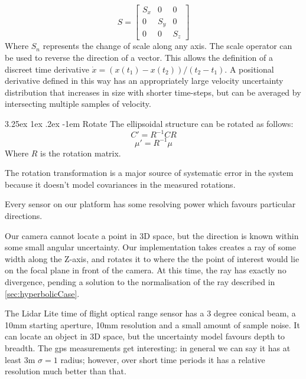 \documentclass[a4paper, 11pt, titlepage]{article}
\makeatletter
\newcounter{subsubsubsection}[subsubsection]
\renewcommand\paragraph{\@startsection{paragraph}{5}{\z@}%
  {3.25ex \@plus1ex \@minus.2ex}%
  {-1em}%
  {\normalfont\normalsize\bfseries}}
\makeatother
\begin{document}
        \begin{equation}
        S=\begin{bmatrix}
          S_x & 0 & 0 \\[0.3em]
          0 & S_y & 0 \\[0.3em]
          0 & 0 & S_z
        \end{bmatrix}
        \end{equation}
        Where \(S_n\) represents the change of scale along any axis.
        The scale operator can be used to reverse the direction of a vector.  This allows the definition of a discreet time derivative \(\dot{x} = (x(t_1) - x(t_2))/(t_2-t_1)\).  A positional derivative defined in this way has an appropriately large velocity uncertainty distribution that increases in size with shorter time-steps, but can be averaged by intersecting multiple samples of velocity.

        \paragraph{Rotate}
        The ellipsoidal structure can be rotated as follows:
        \begin{equation}
        C' = R^{-1} C R
        \end{equation}
        \begin{equation}
        \mu' = R^{-1} \mu
        \end{equation}
        Where \(R\) is the rotation matrix.

        The rotation transformation is a major source of systematic error in the system because it doesn't model covariances in the measured rotations. %

        Every sensor on our platform has some resolving power which favours particular directions.

        Our camera cannot locate a point in 3D space, but the direction is known within some small angular uncertainty.
        Our implementation takes creates a ray of some width along the Z-axis, and rotates it to where the the point of interest would lie on the focal plane in front of the camera.  At this time, the ray has exactly no divergence, pending a solution to the normalisation of the ray described in \ref{sec:hyperbolicCase}.

        The Lidar Lite time of flight optical range sensor has a 3 degree conical beam, a 10mm starting aperture, 10mm resolution and a small amount of sample noise. It can locate an object in 3D space, but the uncertainty model favours depth to breadth.
        The \gls{gps} measurements get interesting: in general we can say it has at least 3m \(\sigma=1\) radius; however, over short time periods it has a relative resolution much better than that.
\end{document}
